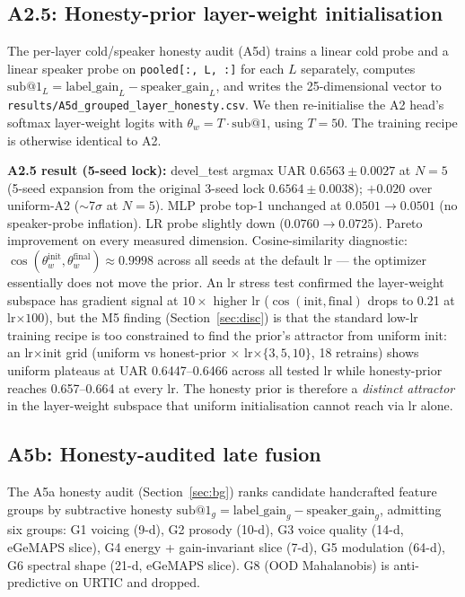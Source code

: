 \subsection{A2.5: Honesty-prior layer-weight initialisation}
\label{ssec:a25}

The per-layer cold/speaker honesty audit (A5d) trains a linear cold probe and a linear speaker probe on \texttt{pooled[:, L, :]} for each $L$ separately, computes $\mathrm{sub}@1_L = \mathrm{label\_gain}_L - \mathrm{speaker\_gain}_L$, and writes the 25-dimensional vector to \texttt{results/A5d\_grouped\_layer\_honesty.csv}. We then re-initialise the A2 head's softmax layer-weight logits with $\theta_w = T \cdot \mathrm{sub}@1$, using $T{=}50$. The training recipe is otherwise identical to A2.

\textbf{A2.5 result (5-seed lock):} devel\_test argmax UAR $0.6563 \pm 0.0027$ at $N{=}5$ (5-seed expansion from the original 3-seed lock $0.6564 \pm 0.0038$); $+0.020$ over uniform-A2 ($\sim$7$\sigma$ at $N{=}5$). MLP probe top-1 unchanged at $0.0501 \to 0.0501$ (no speaker-probe inflation). LR probe slightly down ($0.0760 \to 0.0725$). Pareto improvement on every measured dimension. Cosine-similarity diagnostic: $\cos(\theta_w^{\text{init}}, \theta_w^{\text{final}}) \approx 0.9998$ across all seeds at the default lr — the optimizer essentially does not move the prior. An lr stress test confirmed the layer-weight subspace has gradient signal at $10\times$ higher lr ($\cos(\text{init},\text{final})$ drops to 0.21 at lr$\times 100$), but the M5 finding (Section~\ref{sec:disc}) is that the standard low-lr training recipe is too constrained to find the prior's attractor from uniform init: an lr$\times$init grid (uniform vs honest-prior $\times$ lr$\times\{3, 5, 10\}$, 18 retrains) shows uniform plateaus at UAR 0.6447--0.6466 across all tested lr while honesty-prior reaches 0.657--0.664 at every lr. The honesty prior is therefore a \emph{distinct attractor} in the layer-weight subspace that uniform initialisation cannot reach via lr alone.

\subsection{A5b: Honesty-audited late fusion}
\label{ssec:a5b}

The A5a honesty audit (Section~\ref{sec:bg}) ranks candidate handcrafted feature groups by subtractive honesty $\mathrm{sub}@1_g = \mathrm{label\_gain}_g - \mathrm{speaker\_gain}_g$, admitting six groups: G1 voicing (9-d), G2 prosody (10-d), G3 voice quality (14-d, eGeMAPS slice), G4 energy + gain-invariant slice (7-d), G5 modulation (64-d), G6 spectral shape (21-d, eGeMAPS slice). G8 (OOD Mahalanobis) is anti-predictive on URTIC and dropped.

